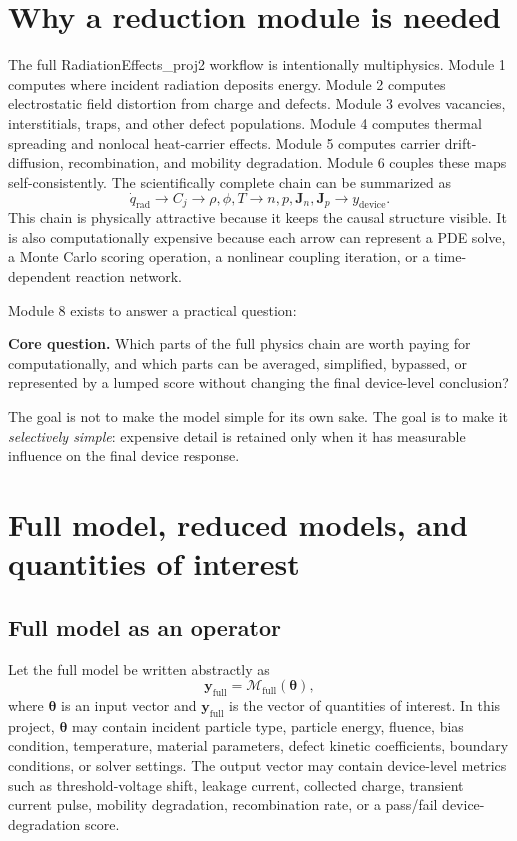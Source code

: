 \documentclass[11pt]{article}
\begin{document}
\section{Why a reduction module is needed}
The full RadiationEffects\_proj2 workflow is intentionally multiphysics. Module 1 computes where incident radiation deposits energy. Module 2 computes electrostatic field distortion from charge and defects. Module 3 evolves vacancies, interstitials, traps, and other defect populations. Module 4 computes thermal spreading and nonlocal heat-carrier effects. Module 5 computes carrier drift-diffusion, recombination, and mobility degradation. Module 6 couples these maps self-consistently. The scientifically complete chain can be summarized as
\begin{equation}
    \dot{q}_{\mathrm{rad}}
    \longrightarrow
    C_j
    \longrightarrow
    \rho,\phi,T
    \longrightarrow
    n,p,\bm{J}_n,\bm{J}_p
    \longrightarrow
    y_{\mathrm{device}}.
    \label{eq:full_project_chain}
\end{equation}
This chain is physically attractive because it keeps the causal structure visible. It is also computationally expensive because each arrow can represent a PDE solve, a Monte Carlo scoring operation, a nonlinear coupling iteration, or a time-dependent reaction network.

Module 8 exists to answer a practical question:
\begin{physicsbox}
\textbf{Core question.} Which parts of the full physics chain are worth paying for computationally, and which parts can be averaged, simplified, bypassed, or represented by a lumped score without changing the final device-level conclusion?
\end{physicsbox}

The goal is not to make the model simple for its own sake. The goal is to make it \emph{selectively simple}: expensive detail is retained only when it has measurable influence on the final device response.

\section{Full model, reduced models, and quantities of interest}
\subsection{Full model as an operator}
Let the full model be written abstractly as
\begin{equation}
    \bm{y}_{\mathrm{full}}
    =
    \mathcal{M}_{\mathrm{full}}(\bm{\theta}),
    \label{eq:full_model_operator}
\end{equation}
where \(\bm{\theta}\) is an input vector and \(\bm{y}_{\mathrm{full}}\) is the vector of quantities of interest. In this project, \(\bm{\theta}\) may contain incident particle type, particle energy, fluence, bias condition, temperature, material parameters, defect kinetic coefficients, boundary conditions, or solver settings. The output vector may contain device-level metrics such as threshold-voltage shift, leakage current, collected charge, transient current pulse, mobility degradation, recombination rate, or a pass/fail device-degradation score.
\end{document}
